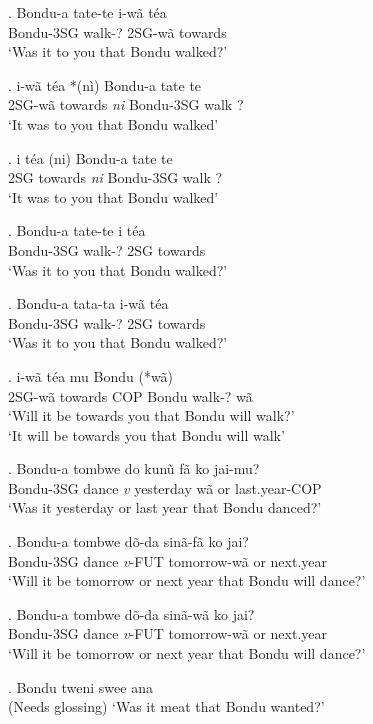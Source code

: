 \documentclass{assets/fieldnotes}
\begin{document}
\exg. Bondu-a tate-te i-wã téa\\
Bondu-3SG walk-? 2SG-wã towards\\
`Was it to you that Bondu walked?'

\exg. i-wã téa *(nì) Bondu-a tate te\\
2SG-wã towards \textit{ni} Bondu-3SG walk ?\\
`It was to you that Bondu walked'

\exg. i téa (ni) Bondu-a tate te\\
2SG towards \textit{ni} Bondu-3SG walk ?\\
`It was to you that Bondu walked'

\exg. Bondu-a tate-te i téa\\
Bondu-3SG walk-? 2SG towards\\
`Was it to you that Bondu walked?'

\exg. Bondu-a tata-ta i-wã téa\\
Bondu-3SG walk-? 2SG towards\\
`Was it to you that Bondu walked?'

\exg. i-wã téa mu Bondu   (*wã)\\
2SG-wã towards COP Bondu walk-? wã\\
`Will it be towards you that Bondu will walk?'\\
`It will be towards you that Bondu will walk'\\

\exg. Bondu-a tombwe do kunũ fã ko jai-mu?\\
Bondu-3SG dance \textit{v} yesterday wã or last.year-COP\\
`Was it yesterday or last year that Bondu danced?'

\exg. Bondu-a tombwe dõ-da sinã-fã ko jai?\\
Bondu-3SG dance \textit{v}-FUT tomorrow-wã or next.year\\
`Will it be tomorrow or next year that Bondu will dance?'

\exg. Bondu-a tombwe dõ-da sinã-wã ko jai?\\
Bondu-3SG dance \textit{v}-FUT tomorrow-wã or next.year\\
`Will it be tomorrow or next year that Bondu will dance?'

\exg. Bondu tweni swee ana\\
(Needs glossing)
`Was it meat that Bondu wanted?'
\end{document}
